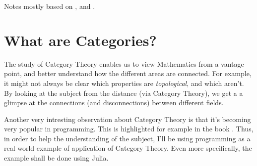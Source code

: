 Notes mostly based on \citet{maico2020categoria},
\citet{bradley2020topology} and \citet{milewski2018category}.

\section{What are Categories?}

The study of Category Theory enables us to view Mathematics from a vantage
point, and better understand how the different areas are connected. For example,
it might not always be clear which properties are \textit{topological}, and which aren't.
By looking at the subject from the distance (via Category Theory), we get a
a glimpse at the connections (and disconnections) between different fields.

Another very intresting observation about Category Theory is that it's
becoming very popular in programming. This is highlighted for example
in the book \citet{milewski2018category}. Thus, in order to help
the understanding of the subject, I'll be using programming as
a real world example of application of Category Theory.
Even more specifically, the example shall be done using Julia.


